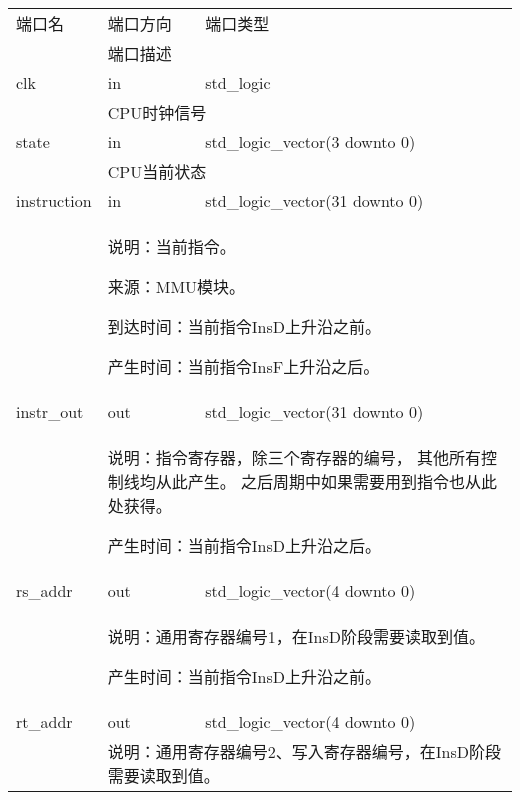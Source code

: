         \begin{tabularx}{\textwidth}{lll}
            \toprule
            端口名          & 端口方向  & 端口类型 \\
            \cmidrule(l){2-3}
            &
            \multicolumn{2}{X}{端口描述} \\
            \midrule
            clk             & in        & std\_logic \\
            \cmidrule(l){2-3}
            &
            \multicolumn{2}{X}{
                CPU时钟信号
            } \\
            \midrule
            state           & in        & std\_logic\_vector(3 downto 0) \\
            \cmidrule(l){2-3}
            &
            \multicolumn{2}{X}{
                CPU当前状态
            } \\
            \midrule
            instruction     & in        & std\_logic\_vector(31 downto 0) \\
            \cmidrule(l){2-3}
            &
            \multicolumn{2}{X}{
                说明：当前指令。

                来源：MMU模块。

                到达时间：当前指令InsD上升沿之前。

                产生时间：当前指令InsF上升沿之后。
            } \\
            \midrule
            instr\_out      & out       & std\_logic\_vector(31 downto 0) \\
            \cmidrule(l){2-3}
            &
            \multicolumn{2}{X}{
                说明：指令寄存器，除三个寄存器的编号，%
                其他所有控制线均从此产生。%
                之后周期中如果需要用到指令也从此处获得。

                产生时间：当前指令InsD上升沿之后。
            } \\
            \midrule
            rs\_addr        & out       & std\_logic\_vector(4 downto 0) \\
            \cmidrule(l){2-3}
            &
            \multicolumn{2}{X}{
                说明：通用寄存器编号1，在InsD阶段需要读取到值。

                产生时间：当前指令InsD上升沿之前。
            } \\
            \midrule
            rt\_addr        & out       & std\_logic\_vector(4 downto 0) \\
            \cmidrule(l){2-3}
            &
            \multicolumn{2}{X}{
                说明：通用寄存器编号2、写入寄存器编号，在InsD阶段需要读取到值。

}
\end{tabularx}
